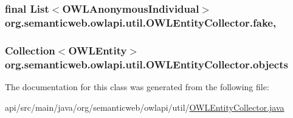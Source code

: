 \hypertarget{classorg_1_1semanticweb_1_1owlapi_1_1util_1_1_o_w_l_entity_collector_a5847b9895b870db9e402f7545f71d8b9}{
\subsubsection[{fake}]{\setlength{\rightskip}{0pt plus 5cm}final List$<${\bf O\-W\-L\-Anonymous\-Individual}$>$ org.\-semanticweb.\-owlapi.\-util.\-O\-W\-L\-Entity\-Collector.\-fake\hspace{0.3cm}{\ttfamily [static]}, {\ttfamily [private]}}}\label{classorg_1_1semanticweb_1_1owlapi_1_1util_1_1_o_w_l_entity_collector_a5847b9895b870db9e402f7545f71d8b9}
\hypertarget{classorg_1_1semanticweb_1_1owlapi_1_1util_1_1_o_w_l_entity_collector_a5c1c8d0a8249cb35b0b4970d537c3e70}{
\subsubsection[{objects}]{\setlength{\rightskip}{0pt plus 5cm}Collection$<${\bf O\-W\-L\-Entity}$>$ org.\-semanticweb.\-owlapi.\-util.\-O\-W\-L\-Entity\-Collector.\-objects\hspace{0.3cm}{\ttfamily [private]}}}\label{classorg_1_1semanticweb_1_1owlapi_1_1util_1_1_o_w_l_entity_collector_a5c1c8d0a8249cb35b0b4970d537c3e70}


The documentation for this class was generated from the following file\-:\begin{DoxyCompactItemize}
\item 
api/src/main/java/org/semanticweb/owlapi/util/\hyperlink{_o_w_l_entity_collector_8java}{O\-W\-L\-Entity\-Collector.\-java}\end{DoxyCompactItemize}
